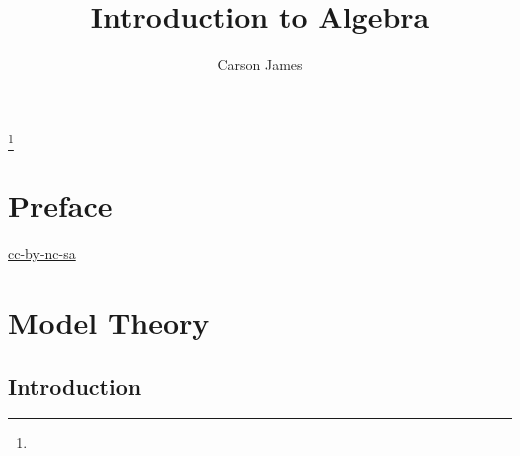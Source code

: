 \documentclass{book}
\begin{document}
	
	\frontmatter
	
	\title{Introduction to Algebra}
	
	
	\author{Carson James}
	\thanks{}
	
	\date{}
	
	\maketitle
	
	
	\setcounter{page}{4}
	
	\tableofcontents
	\printunsrtglossary[type=symbols,style=long,title={Notation}]
	
	
	\mainmatter
	
	\chapter*{Preface}
	
	\begin{flushleft}
		\href{https://creativecommons.org/licenses/by-nc-sa/4.0/legalcode.txt}{cc-by-nc-sa}
	\end{flushleft}
	
	\newpage
	
	
	
	
	
	
	
	
	\newpage
	\chapter{Model Theory}
	
	\section{Introduction}
	
\end{document}
